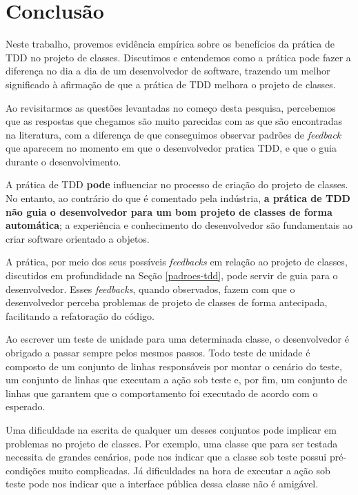 \documentclass[conference]{IEEEtran}
\begin{document}
\section{Conclusão}

Neste trabalho, provemos evidência empírica sobre os benefícios da prática de TDD
no projeto de classes.
Discutimos e entendemos como a prática pode
fazer a diferença no dia a dia de um desenvolvedor de software,
trazendo um melhor significado à afirmação de que a prática de TDD melhora o projeto de classes.

Ao revisitarmos as questões levantadas no começo desta pesquisa,
percebemos que as respostas que chegamos são muito parecidas
com as que são encontradas na literatura, com a diferença de 
que conseguimos observar padrões de \textit{feedback} que aparecem
no momento em que o desenvolvedor pratica TDD, e que o guia durante
o desenvolvimento.

A prática de TDD \textbf{pode} influenciar no processo de criação do projeto de classes.
No entanto, ao contrário do que é comentado pela indústria,
\textbf{a prática de TDD não guia o desenvolvedor para um bom projeto de classes
de forma automática}; a experiência e conhecimento 
do desenvolvedor são fundamentais ao criar software orientado a objetos. 

A prática, por meio dos seus possíveis \textit{feedbacks} em relação ao
projeto de classes, discutidos
em profundidade na Seção \ref{padroes-tdd}, pode servir de guia
para o desenvolvedor. Esses \textit{feedbacks}, quando observados, fazem
com que o desenvolvedor perceba problemas de projeto de classes de
forma antecipada, facilitando a refatoração do código.

Ao escrever um teste de unidade para uma determinada classe, o desenvolvedor
é obrigado a passar sempre pelos mesmos passos. Todo teste de unidade é composto
de um conjunto de linhas responsáveis por montar o cenário do teste, um conjunto
de linhas que executam a ação sob teste e, por fim, um conjunto de linhas que
garantem que o comportamento foi executado de acordo com o esperado.

Uma dificuldade na escrita de qualquer um desses conjuntos pode implicar
em problemas no projeto de classes. Por exemplo, uma classe que para
ser testada necessita de grandes cenários, pode nos indicar que a classe
sob teste possui pré-condições muito complicadas. Já dificuldades na hora
de executar a ação sob teste pode nos indicar que a interface pública dessa
classe não é amigável. 
\end{document}

